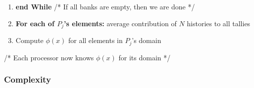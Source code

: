 \documentclass[12pt]{article}
\begin{document}
{{\begin{algorithm}
\begin{enumerate}
\begin{enumerate}
         \begin{itemize}
            \item Inform $P_{j+1}$ bank size to receive
            \item Send(rightbank, destination=$P_{j+1}$)
         \end{itemize}
     \item Check with neighbors if receiving banks
       \item \textbf{IF} size(leftbank) $> 0$:
         \begin{itemize}
             \item Inform $P_{j-1}$ bank size to receive
            \item Send(leftbank, destination=$P_{j-1}$)
         \end{itemize}
       \item \textbf{IF} recieving banks: 
         \begin{itemize}
              \item Recieve banks into one list of particles $\rightarrow mylist$
          \end{itemize}
      \item Synchronization among processors /* Ensure all banks have been received */
      \item \textbf{For each} particle in $mylist$
          \begin{itemize}
              \item Execute steps \ref{itm:start} to \ref{itm:end} on particle
          \end{itemize}
     \item \textbf{IF} (size(rightbank) = 0 \& size(leftbank) = 0) done := true
     \item Compute logical OR using \verb{MPI_Reduce{ on $done$'s, stored in $alldone$
    \end{enumerate}
    \item[] \textbf{end While} /* If all banks are empty, then we are done */
    \item \textbf{For each of $P_j$'s elements:} average contribution of $N$ histories to all tallies
    \item Compute $\phi(x)$ for all elements in $P_j$'s domain
\end{enumerate}
/* Each processor now knows $\phi(x)$ for its domain */
\end{algorithm}

\subsubsection{Complexity}

}}
\end{document}
